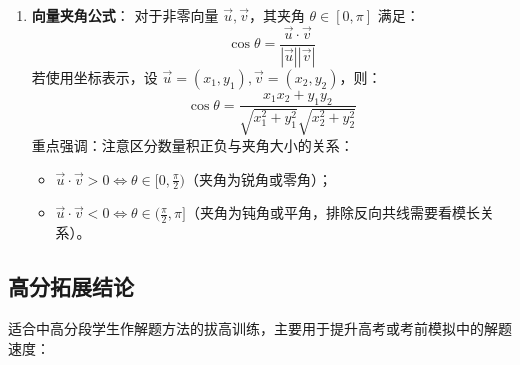 \documentclass[11pt,a4paper]{ctexart}
\begin{document}
\begin{enumerate}[label=\arabic*. , leftmargin=2em, itemsep=1.2em, topsep=0.2em]
\begin{center}
    \par\vspace{0.2em}
    {\small\textbf{图 2.3 线面角示意图}}
  \end{center}
  教学规范步骤（“作—证—算”）：

  \item \textbf{向量夹角公式}：
  对于非零向量 \(\vec{u}, \vec{v}\)，其夹角 \(\theta \in [0, \pi]\) 满足：
  \[
  \cos\theta = \frac{\vec{u} \cdot \vec{v}}{|\vec{u}||\vec{v}|}
  \]
  若使用坐标表示，设 \(\vec{u} = (x_1, y_1), \vec{v} = (x_2, y_2)\)，则：
  \[
  \cos\theta = \frac{x_1x_2 + y_1y_2}{\sqrt{x_1^2+y_1^2}\sqrt{x_2^2+y_2^2}}
  \]
  重点强调：注意区分数量积正负与夹角大小的关系：
  \begin{itemize}[label=\(\circ\), leftmargin=1.5em, itemsep=0.1em]
    \item \(\vec{u}\cdot\vec{v} > 0 \iff \theta \in [0, \frac{\pi}{2})\)（夹角为锐角或零角）；
    \item \(\vec{u}\cdot\vec{v} < 0 \iff \theta \in (\frac{\pi}{2}, \pi]\)（夹角为钝角或平角，排除反向共线需要看模长关系）。
  \end{itemize}
\end{enumerate}

\subsection{高分拓展结论}
适合中高分段学生作解题方法的拔高训练，主要用于提升高考或考前模拟中的解题速度：
\end{document}

